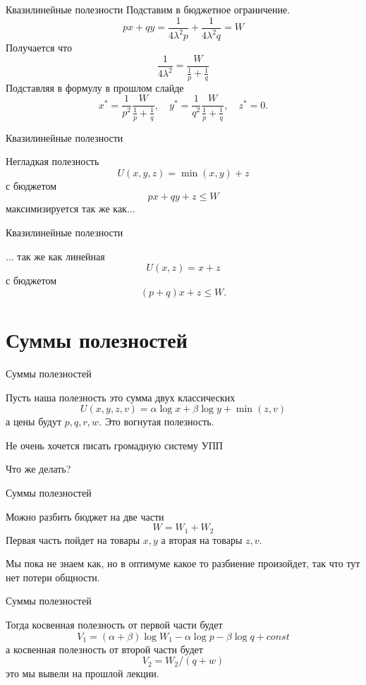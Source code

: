 \documentclass{beamer}
\begin{document}
\begin{frame}{Квазилинейные полезности}
Подставим в бюджетное ограничение.
$$px + qy = \frac{1}{4 \lambda^2 p} + \frac{1}{4 \lambda^2 q} = W$$
Получается что 
$$\frac{1}{4 \lambda^2} = \frac{W}{\frac{1}{p} + \frac{1}{q}}$$
Подставляя в формулу в прошлом слайде
$$x^* = \frac{1}{p^2}\frac{W}{\frac{1}{p} + \frac{1}{q}}, \quad y^* = \frac{1}{q^2}\frac{W}{\frac{1}{p} + \frac{1}{q}}, \quad z^* = 0.$$

\end{frame}

\begin{frame}{Квазилинейные полезности}
	
Негладкая полезность
$$ U(x,y,z) = \min(x,y) + z$$
с бюджетом
$$ px + qy + z \leqslant W$$
максимизируется так же как...
\end{frame}

\begin{frame}{Квазилинейные полезности}
	
... так же как линейная
$$ U(x,z) = x + z$$
с бюджетом
$$ (p+q)x + z \leqslant W.$$

\end{frame}

\section{Суммы полезностей}

\begin{frame}{Суммы полезностей}
	
Пусть наша полезность это сумма двух классических
$$ U(x,y,z,v) = \alpha \log x + \beta \log y + \min(z,v) $$
а цены будут $p,q,r,w$. Это вогнутая полезность.

Не очень хочется писать громадную систему УПП

Что же делать?
\end{frame}

\begin{frame}{Суммы полезностей}
	
Можно разбить бюджет на две части 
$$W = W_1 + W_2$$
Первая часть пойдет на товары $x,y$ а вторая на товары $z,v$.

Мы пока не знаем как, но в оптимуме какое то разбиение произойдет, так что тут нет потери общности.

\end{frame}

\begin{frame}{Суммы полезностей}

Тогда косвенная полезность от первой части будет
$$ V_1 = (\alpha + \beta) \log W_1 - \alpha \log p - \beta \log q + const$$
а косвенная полезность от второй части будет
$$ V_2 = W_2/(q + w)$$
это мы вывели на прошлой лекции.
\end{frame}
\end{document}
